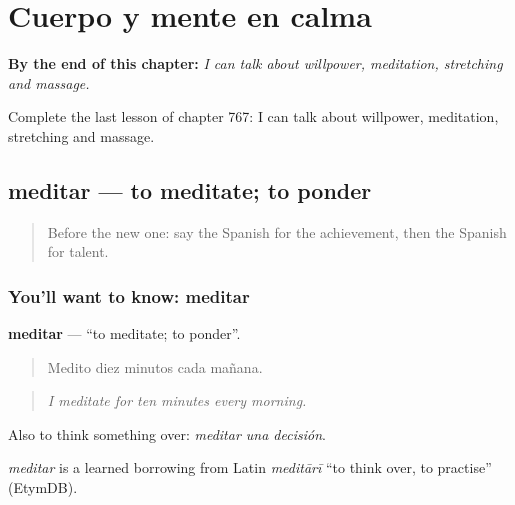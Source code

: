 
\chapter{Cuerpo y mente en calma}
\label{ch:es-cuerpo-y-mente-en-calma}

\begin{chapteropening}
\textbf{By the end of this chapter:} \emph{I can talk about willpower, meditation, stretching and massage.}

Complete the last lesson of chapter 767: I can talk about willpower, meditation, stretching and massage.
\end{chapteropening}

\section[meditar]{meditar — to meditate; to ponder}

\label{lesson:ES-C767-meditar}



\begin{quote}
Before the new one: say the Spanish for the achievement, then the Spanish for talent.
\end{quote}

\subsection*{You'll want to know: meditar}
\textbf{meditar} — \textquotedblleft{}to meditate; to ponder\textquotedblright{}.

\begin{quote}
Medito diez minutos cada mañana.
\end{quote}

\begin{quote}
\emph{I meditate for ten minutes every morning.}
\end{quote}

Also to think something over: \emph{meditar una decisión}.

\begin{cousinweb}
\emph{meditar} is a learned borrowing from Latin \emph{meditārī} \textquotedblleft{}to think over, to practise\textquotedblright{} (EtymDB).
\end{cousinweb}

